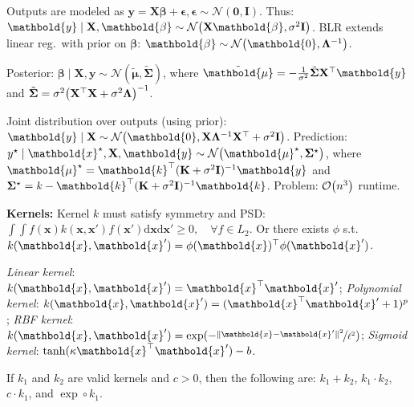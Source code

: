 \documentclass[9pt]{extarticle}
\newenvironment{topic}[1]
{\textbf{\sffamily \colorbox{black}{\rlap{\textbf{\textcolor{white}{#1}}}\hspace{\linewidth}\hspace{-2\fboxsep}}}}
{}
\newenvironment{subtopic}[1]
{\textbf{\sffamily #1:}}
{}
\renewcommand{\mat}[1]{\ensuremath{\mathbf{#1}}}
\renewcommand{\vec}[1]{\ensuremath{\mathbold{#1}}}
\begin{document}
\begin{multicols*}{3}
\begin{topic}{Causality}
    \end{topic}

    \begin{topic}{Gaussian processes}
        Outputs are modeled as $\vec{y} = \mat{X} \vec{\beta} + \vec{\epsilon}, \vec{\epsilon} \sim
            \mathcal{N}(\vec{0}, \mat{I})$. Thus: $\vec{y} \mid \mat{X}, \vec{\beta} \sim
            \mathcal{N}\lft(\mat{X} \vec{\beta}, \sigma^2 \mat{I}\rgt)$. BLR extends linear reg.\ with prior on
        $\vec{\beta}$: $\vec{\beta} \sim \mathcal{N}\lft(\vec{0}, \inv{\mat{\Lambda}}\rgt)$.

        Posterior: $\vec{\beta} \mid \mat{X}, \vec{y} \sim \mathcal{N}(\tilde{\vec{\mu}},
            \tilde{\mat{\Sigma}})$, where $\tilde{\vec{\mu}} = -\frac{1}{\sigma^2} \tilde{\mat{\Sigma}} \transpose{\mat{X}} \vec{y}$ and $\tilde{\mat{\Sigma}} = \sigma^2 \inv{\lft( \transpose{\mat{X}} \mat{X} + \sigma^2 \mat{\Lambda} \rgt)}$.

        Joint distribution over outputs (using prior): $\vec{y} \mid \mat{X} \sim \mathcal{N}\lft(\vec{0},
            \mat{X}\inv{\mat{\Lambda}} \transpose{\mat{X}} + \sigma^2 \mat{I}\rgt)$. Prediction: $y^\star \mid
            \vec{x}^\star, \mat{X}, \vec{y} \sim \mathcal{N} \lft( \vec{\mu}^\star, \mat{\Sigma}^\star \rgt)$,
        where $\vec{\mu}^\star = \transpose{\vec{k}} \inv{(\mat{K} + \sigma^2 \mat{I})} \vec{y}$ and
        $\mat{\Sigma}^\star = k - \transpose{\vec{k}} \inv{(\mat{K} + \sigma^2 \mat{I})} \vec{k}$. Problem:
        $\bigo{n^3}$ runtime.

        \begin{subtopic}{Kernels}
            Kernel $k$ must satisfy symmetry and PSD: $\int \int f(\vec{x}) k(\vec{x}, \vec{x}') f(\vec{x}') \mathrm{d}\vec{x}\mathrm{d}\vec{x}' \geq 0, \quad \forall f \in L_2$.
            Or there exists $\phi$ s.t.\ $k(\vec{x}, \vec{x}') = \transpose{\phi(\vec{x})} \phi(\vec{x}')$.

            \textit{Linear kernel}: $k(\vec{x}, \vec{x}') = \transpose{\vec{x}} \vec{x}'$;
            \textit{Polynomial kernel}: $k(\vec{x}, \vec{x}') = ( \transpose{\vec{x}} \vec{x}' + 1 )^p$;
            \textit{RBF kernel}: $k(\vec{x},\vec{x}') = \exp ( -\nicefrac{\| \vec{x} - \vec{x}' \|^2}{\ell^2})$;
            \textit{Sigmoid kernel}: $\tanh(\kappa \transpose{\vec{x}} \vec{x}') - b$.

            If $k_1$ and $k_2$ are valid kernels and $c > 0$, then the following are: $k_1 + k_2$, $k_1 \cdot
                k_2$, $c \cdot k_1$, and $\exp \circ k_1$.


\end{subtopic}
\end{topic}
\end{multicols*}
\end{document}
